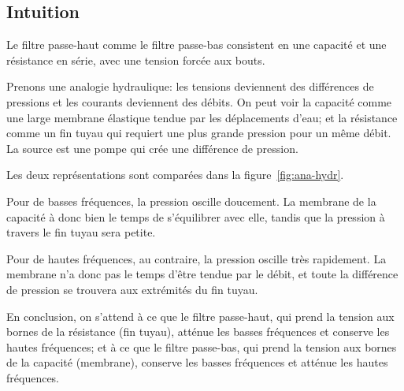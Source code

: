 \subsection{Intuition}

Le filtre passe-haut comme le filtre passe-bas
consistent en une capacité et une résistance en série,
avec une tension forcée aux bouts.

Prenons une analogie hydraulique:
les tensions deviennent des différences de pressions
et les courants deviennent des débits.
On peut voir la capacité comme une large membrane élastique
tendue par les déplacements d'eau;
et la résistance comme un fin tuyau
qui requiert une plus grande pression pour un même débit.
La source est une pompe qui crée une différence de pression.

Les deux représentations sont comparées dans la figure~\ref{fig:ana-hydr}.

Pour de basses fréquences, la pression oscille doucement.
La membrane de la capacité à donc bien le temps de s'équilibrer avec elle,
tandis que la pression à travers le fin tuyau sera petite.

Pour de hautes fréquences, au contraire,
la pression oscille très rapidement.
La membrane n'a donc pas le temps d'être tendue par le débit,
et toute la différence de pression
se trouvera aux extrémités du fin tuyau.

En conclusion, on s'attend à ce que le filtre passe-haut,
qui prend la tension aux bornes de la résistance (fin tuyau),
atténue les basses fréquences et conserve les hautes fréquences;
et à ce que le filtre passe-bas,
qui prend la tension aux bornes de la capacité (membrane),
conserve les basses fréquences et atténue les hautes fréquences.
